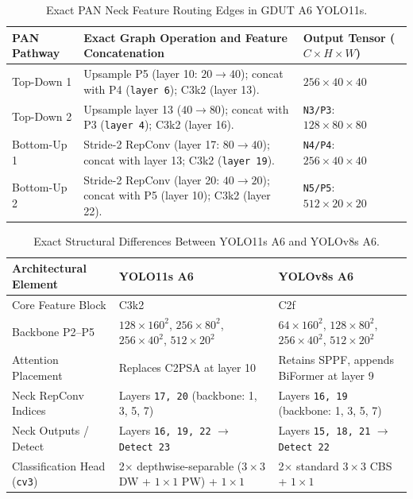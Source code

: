 \begin{table}[htbp]
\centering
\caption{Exact PAN Neck Feature Routing Edges in GDUT A6 YOLO11s.}
\label{tab:ch4_pan_edges}
\footnotesize
\renewcommand{\arraystretch}{1.12}
\begin{tabularx}{\textwidth}{|p{2.4cm}|X|p{3.6cm}|}
\hline
\rowcolor{slatehdr}
\textbf{PAN Pathway} & \textbf{Exact Graph Operation and Feature Concatenation} & \textbf{Output Tensor ($C \times H \times W$)} \\
\hline
Top-Down 1 & Upsample P5 (layer 10: $20 \to 40$); concat with P4 (\texttt{layer 6}); C3k2 (layer 13). & $256 \times 40 \times 40$ \\ \hline
Top-Down 2 & Upsample layer 13 ($40 \to 80$); concat with P3 (\texttt{layer 4}); C3k2 (layer 16). & \texttt{N3/P3}: $128 \times 80 \times 80$ \\ \hline
Bottom-Up 1 & Stride-2 RepConv (layer 17: $80 \to 40$); concat with layer 13; C3k2 (\texttt{layer 19}). & \texttt{N4/P4}: $256 \times 40 \times 40$ \\ \hline
Bottom-Up 2 & Stride-2 RepConv (layer 20: $40 \to 20$); concat with P5 (layer 10); C3k2 (layer 22). & \texttt{N5/P5}: $512 \times 20 \times 20$ \\ \hline
\end{tabularx}
\end{table}

\begin{table}[htbp]
\centering
\caption{Exact Structural Differences Between YOLO11s A6 and YOLOv8s A6.}
\label{tab:ch4_y11_vs_v8}
\footnotesize
\renewcommand{\arraystretch}{1.12}
\begin{tabularx}{\textwidth}{|p{3.5cm}|X|X|}
\hline
\rowcolor{slatehdr}
\textbf{Architectural Element} & \textbf{YOLO11s A6} & \textbf{YOLOv8s A6} \\
\hline
Core Feature Block & C3k2 & C2f \\ \hline
Backbone P2--P5 & $128\times 160^2$, $256\times 80^2$, $256\times 40^2$, $512\times 20^2$ & $64\times 160^2$, $128\times 80^2$, $256\times 40^2$, $512\times 20^2$ \\ \hline
Attention Placement & Replaces C2PSA at layer 10 & Retains SPPF, appends BiFormer at layer 9 \\ \hline
Neck RepConv Indices & Layers \texttt{17, 20} (backbone: 1, 3, 5, 7) & Layers \texttt{16, 19} (backbone: 1, 3, 5, 7) \\ \hline
Neck Outputs / Detect & Layers \texttt{16, 19, 22} $\to$ \texttt{Detect 23} & Layers \texttt{15, 18, 21} $\to$ \texttt{Detect 22} \\ \hline
Classification Head (\texttt{cv3}) & 2$\times$ depthwise-separable ($3\times 3$ DW + $1\times 1$ PW) + $1\times 1$ & 2$\times$ standard $3\times 3$ CBS + $1\times 1$ \\ \hline
\end{tabularx}
\end{table}

